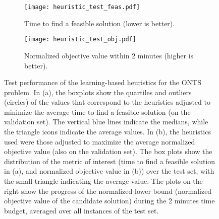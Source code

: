 \begin{figure}[h]
    \centering
    \begin{subfigure}{0.99\textwidth}
        \centering
        \texttt{[image: heuristic\_test\_feas.pdf]}
        \caption{Time to find a feasible solution (lower is better).}
        \label{fig:heuristics-test-results-feas}
    \end{subfigure}
    \begin{subfigure}{0.99\textwidth}
        \centering
        \texttt{[image: heuristic\_test\_obj.pdf]}
        \caption{Normalized objective value within 2 minutes (higher is better).}
        \label{fig:heuristics-test-results-obj}
    \end{subfigure}
    \caption{%
    Test performance of the learning-based heuristics for the ONTS problem.
    In (a), the boxplots show the quartiles and outliers (circles) of the values that correspond to the heuristics adjusted to minimize the average time to find a feasible solution (on the validation set).
    The vertical blue lines indicate the medians, while the triangle icons indicate the average values.
    In (b), the heuristics used were those adjusted to maximize the average normalized objective value (also on the validation set).
    The box plots show the distribution of the metric of interest (time to find a feasible solution in (a), and normalized objective value in (b)) over the test set, with the small triangle indicating the average value.
    The plots on the right show the progress of the normalized lower bound (normalized objective value of the candidate solution) during the 2 minutes time budget, averaged over all instances of the test set.
}
    \label{fig:heuristics-test-results}
\end{figure}

